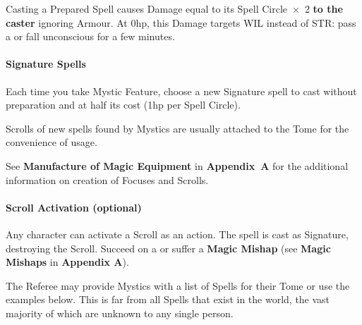 \documentclass[itdr]{subfiles}
\begin{document}
Casting a Prepared Spell causes Damage equal to its Spell Circle~$\times$~2 \textbf{to the caster} ignoring Armour. At 0hp, this Damage targets WIL instead of STR: pass a  or fall unconscious for a few minutes.

\vfill
{}
\paragraph{Signature Spells}
Each time you take Mystic Feature, choose a new Signature spell to cast without preparation and at half its cost (1hp per Spell Circle).

\vfill
\begin{dbox}
	Scrolls of new spells found by Mystics are usually attached to the Tome for the convenience of usage.
	
	See \textbf{Manufacture of Magic Equipment} in \mbox{\textbf{Appendix A}} for the additional information on creation of Focuses and Scrolls.
\end{dbox}

\vfill
\break

\begin{dbox}
	\paragraph{Scroll Activation (optional)}
	Any character can activate a Scroll as an action. The spell is cast as Signature, destroying the Scroll. Succeed on a  or suffer a \textbf{Magic Mishap} (see \textbf{Magic Mishaps} in \textbf{Appendix A}).
\end{dbox}

\vfill

The Referee may provide Mystics with a list of Spells for their Tome or use the examples below. This is far from all Spells that exist in the world, the vast majority of which are unknown to any single person.

\vfill
\end{document}
